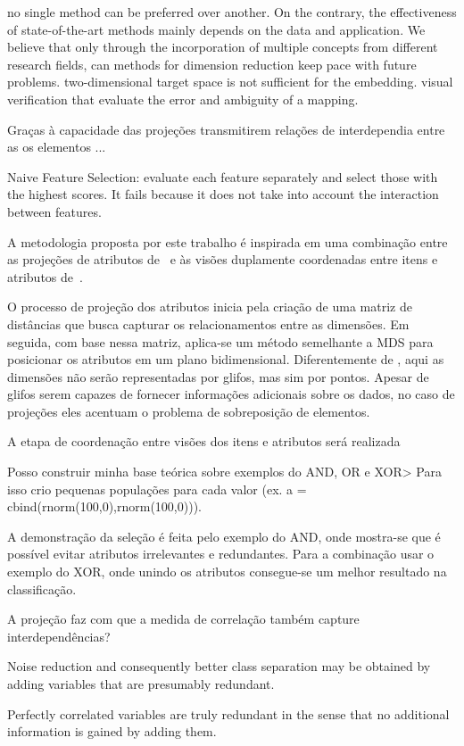 \cite{Engel2012} no single method can be preferred over another. On the contrary, the effectiveness of state-of-the-art methods mainly depends on the data and application. 
We believe that only through the incorporation of multiple concepts from different research fields, can methods for dimension reduction keep pace with future problems. two-dimensional target space is not sufficient for the embedding. visual verification that evaluate the error and ambiguity of a mapping.

Graças à capacidade das projeções transmitirem relações de interdependia entre as os elementos ... 

Naive Feature Selection: evaluate each feature separately and select those with the highest scores. It fails because it does not take into account the interaction between features.

A metodologia proposta por este trabalho é inspirada em uma combinação entre as projeções de atributos de~\cite{Yang2004} e às visões duplamente coordenadas entre itens e atributos de~\cite{Turkay2011}. 

O processo de projeção dos atributos inicia pela criação de uma matriz de distâncias que busca capturar os relacionamentos entre as dimensões. Em seguida, com base nessa matriz, aplica-se um método semelhante a MDS para posicionar os atributos em um plano bidimensional. Diferentemente de \cite{Yang2004}, aqui as dimensões não serão representadas por glifos, mas sim por pontos. Apesar de glifos serem capazes de fornecer informações adicionais sobre os dados, no caso de projeções eles acentuam o problema de sobreposição de elementos.

A etapa de coordenação entre visões dos itens e atributos será realizada 

Posso construir minha base teórica sobre exemplos do AND, OR e XOR> Para isso crio pequenas populações para cada valor (ex. a = cbind(rnorm(100,0),rnorm(100,0))).

A demonstração da seleção é feita pelo exemplo do AND, onde mostra-se que é possível evitar atributos irrelevantes e redundantes.
Para a combinação usar o exemplo do XOR, onde unindo os atributos consegue-se um melhor resultado na classificação.

A projeção faz com que a medida de correlação também capture interdependências?

Noise reduction and consequently better class separation may be obtained by adding variables that are presumably redundant.

Perfectly correlated variables are truly redundant in the sense that no additional information is gained by adding them.

